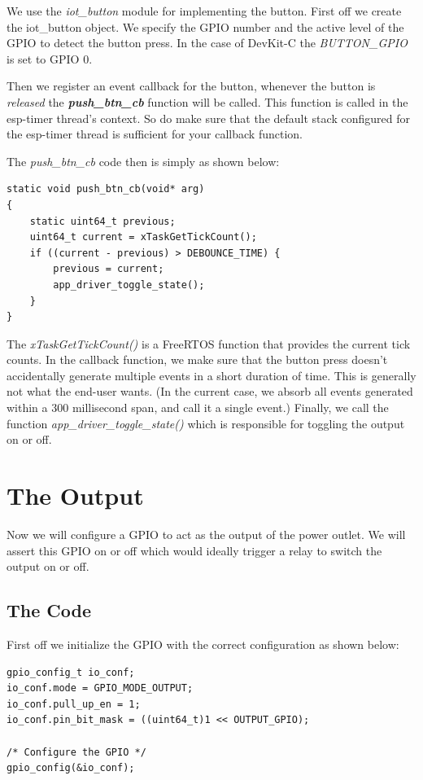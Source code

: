 \documentclass[11pt,fleqn]{book} %
\begin{document}
We use the \textit{iot\_button} module for implementing the button. 
First off we create the iot\_button object. We specify the GPIO number and the active level of the GPIO to detect the button press. In the case of DevKit-C the \textit{BUTTON\_GPIO} is set to GPIO 0. 

Then we register an event callback for the button, whenever the button is \textit{released} the \textit{\textbf{push\_btn\_cb}} function will be called. This function is called in the esp-timer thread's context. So do make sure that the default stack configured for the esp-timer thread is sufficient for your callback function.

The \textit{push\_btn\_cb} code then is simply as shown below:
\begin{verbatim}
static void push_btn_cb(void* arg)
{
    static uint64_t previous;
    uint64_t current = xTaskGetTickCount();
    if ((current - previous) > DEBOUNCE_TIME) {
        previous = current;
        app_driver_toggle_state();
    }
}
\end{verbatim}

The \textit{xTaskGetTickCount()} is a FreeRTOS function that provides the current tick counts. In the callback function, we make sure that the button press doesn't accidentally generate multiple events in a short duration of time. This is generally not what the end-user wants. (In the current case, we absorb all events generated within a 300 millisecond span, and call it a single event.)
Finally, we call the function \textit{app\_driver\_toggle\_state()} which is responsible for toggling the output on or off.

\section{The Output}
Now we will configure a GPIO to act as the output of the power outlet. We will assert this GPIO on or off which would ideally trigger a relay to switch the output on or off.

\subsection{The Code}
First off we initialize the GPIO with the correct configuration as shown below:

\begin{verbatim}
gpio_config_t io_conf;
io_conf.mode = GPIO_MODE_OUTPUT;
io_conf.pull_up_en = 1;
io_conf.pin_bit_mask = ((uint64_t)1 << OUTPUT_GPIO);

/* Configure the GPIO */
gpio_config(&io_conf);

\end{verbatim}
\end{document}
